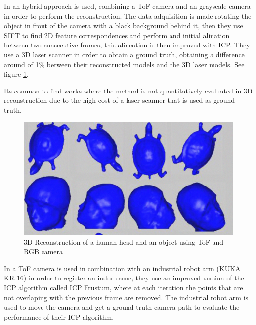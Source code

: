 In \cite{guangyu} an hybrid approach is used, combining a ToF camera and an grayscale camera in order to perform the reconstruction. 
The data adquisition is made rotating the object in front of the camera with a black background behind it, then they use 
SIFT to find 2D feature correspondences and perform and initial alination between two consecutive frames, this alineation is 
then improved with ICP. They use a 3D laser scanner in order to obtain a ground truth, obtaining a difference around of 1\% 
between their reconstructed
 models and the 3D laser models. See figure \ref{fig:guangyu}.

Its common to find works where the method is not quantitatively evaluated 
in 3D reconstruction due to the high 
cost of a laser scanner that is used as ground truth. 


\begin{figure}[h!]
\begin{center}
\includegraphics[scale=0.38]{images/guangyu}
\caption{3D Reconstruction of a human head and an object using ToF and RGB camera}
\label{fig:guangyu}
\end{center}
\end{figure}

In \cite{may2009} a ToF camera is used in combination with an industrial robot arm (KUKA KR 16) in order to register an indor scene,
they use an improved version of the ICP algorithm called ICP Frustum, where at each iteration the points that are not overlaping with the previous frame are removed. The industrial robot arm is used to move the camera and get a ground truth camera path to evaluate the performance of their ICP algorithm. 


